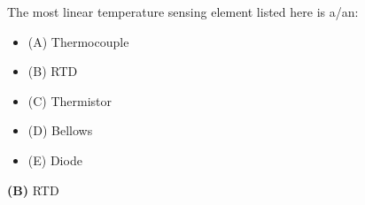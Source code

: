 

The most linear temperature sensing element listed here is a/an:

\begin{itemize}
\item{(A)} Thermocouple
\vskip 5pt 
\item{(B)} RTD
\vskip 5pt 
\item{(C)} Thermistor
\vskip 5pt 
\item{(D)} Bellows
\vskip 5pt 
\item{(E)} Diode
\end{itemize}







{\bf (B)} RTD
 









